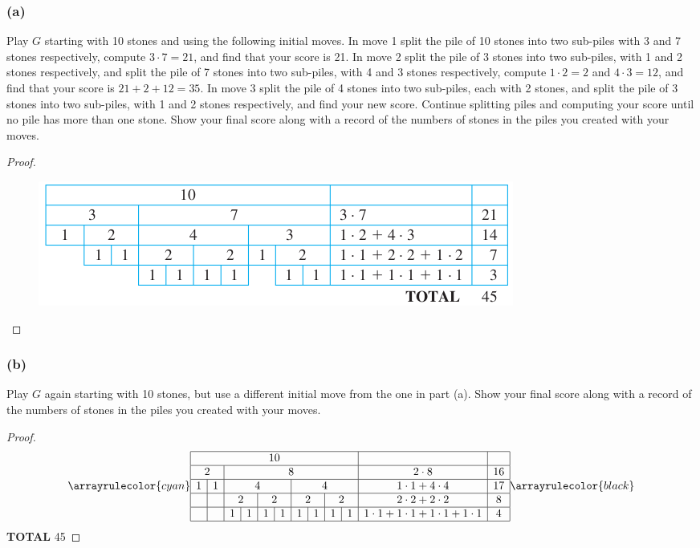 \documentclass[14pt]{extarticle}
\begin{document}
\subsubsection{(a)}
Play $G$ starting with 10 stones and using the following initial moves. In move 1 split the pile of 10 stones into two sub-piles with 3 and 7 stones respectively, compute $3 \cdot 7 = 21$, and find that your score is 21. In move 2 split the pile of 3 stones into two sub-piles, with 1 and 2 stones respectively, and split the pile of 7 stones into two sub-piles, with 4 and 3 stones respectively, compute $1 \cdot 2 = 2$ and $4 \cdot 3 = 12$, and find that your score is $21 + 2 + 12 = 35$. In move 3 split the pile of 4 stones into two sub-piles, each with 2 stones, and split the pile of 3 stones into two sub-piles, with 1 and 2 stones respectively, and find your new score. Continue splitting piles and computing your score until no pile has more than one stone. Show your final score along with a record of the numbers of stones in the piles you created with your moves.

\begin{proof}
\begin{figure}[ht!]
\centering
\includegraphics[scale=0.6]{../images/5.4.23.a.png}
\end{figure}
\end{proof}

\subsubsection{(b)}
Play $G$ again starting with 10 stones, but use a different initial move from the one in part (a). Show your final score along with a record of the numbers of stones in the piles you created with your moves.

\begin{proof}
\[
\arrayrulecolor{cyan}
\begin{array}{|c|c|c|c|c|c|c|c|c|c|c|c|}
\hline
\multicolumn{10}{|c|}{10} & & \\
\hline
\multicolumn{2}{|c}{2} & \multicolumn{8}{|c|}{8} & 2 \cdot 8 & 16 \\
\hline
1 & 1 & \multicolumn{4}{c|}{4} & \multicolumn{4}{c|}{4} & 1 \cdot 1 + 4 \cdot 4 & 17 \\
\hline
 &  & \multicolumn{2}{c|}{2} & \multicolumn{2}{c|}{2} & \multicolumn{2}{c|}{2} & \multicolumn{2}{c|}{2} & 2 \cdot 2 + 2 \cdot 2 & 8 \\
\hline
 &  & 1 & 1 & 1 & 1 & 1 & 1 & 1 & 1 & 1 \cdot 1 + 1 \cdot 1 + 1 \cdot 1 + 1 \cdot 1 & 4 \\
\hline
\end{array}
\arrayrulecolor{black}
\]
{\bf TOTAL} 45
\end{proof}
\end{document}
